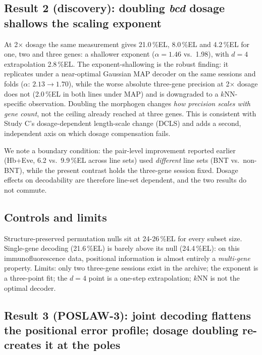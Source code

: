 \subsection{Result 2 (discovery): doubling \emph{bcd} dosage shallows the
scaling exponent}

At 2$\times$ dosage the same measurement gives 21.0\,\%EL, 8.0\,\%EL and
4.2\,\%EL for one, two and three genes: a shallower exponent ($\alpha = 1.46$
vs.\ 1.98), with $d=4$ extrapolation 2.8\,\%EL. The exponent-shallowing is the
robust finding: it replicates under a near-optimal Gaussian MAP decoder on the
same sessions and folds ($\alpha$: $2.13 \to 1.70$), while the worse absolute
three-gene precision at 2$\times$ dosage does not (2.0\,\%EL in both lines
under MAP) and is downgraded to a $k$NN-specific observation. Doubling the
morphogen changes \emph{how precision scales with gene count}, not the ceiling
already reached at three genes. This is consistent with Study C's
dosage-dependent length-scale change (DCLS) and adds a second, independent axis
on which dosage compensation fails.

We note a boundary condition: the pair-level improvement reported earlier
(Hb+Eve, 6.2 vs.\ 9.9\,\%EL across line sets) used \emph{different} line sets
(BNT vs.\ non-BNT), while the present contrast holds the three-gene session
fixed. Dosage effects on decodability are therefore line-set dependent, and the
two results do not commute.

\subsection{Controls and limits}

Structure-preserved permutation nulls sit at 24-26\,\%EL for every subset size.
Single-gene decoding (21.6\,\%EL) is barely above its null (24.4\,\%EL): on this
immunofluorescence data, positional information is almost entirely a
\emph{multi-gene} property. Limits: only two three-gene sessions exist in the
archive; the exponent is a three-point fit; the $d=4$ point is a one-step
extrapolation; $k$NN is not the optimal decoder.

\subsection{Result 3 (POSLAW-3): joint decoding flattens the positional error
profile; dosage doubling re-creates it at the poles}

